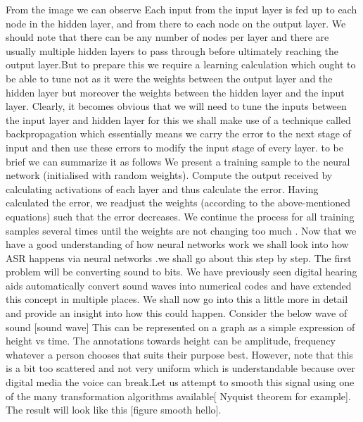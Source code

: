 \documentclass[sigconf]{acmart}
\begin{document}
From the image we can observe Each input from the input layer is fed up to each node in the hidden layer, and from there to each node on the output layer. We should note that there can be any number of nodes per layer and there are usually multiple hidden layers to pass through before ultimately reaching the output layer.But to prepare this we require a learning calculation which ought to be able to tune not as it were the weights between the output layer and the hidden layer but moreover the weights between the hidden layer and the input layer. Clearly, it becomes obvious that we will need to tune the inputs between the input layer and hidden layer for this we shall make use of a technique called backpropagation which essentially means we carry the error to the next stage of input and then use these errors to modify the input stage of every layer. to be brief we can summarize it as follows We present a training sample to the neural network (initialised with random weights). Compute the output received by calculating activations of each layer and thus calculate the error. Having calculated the error, we readjust the weights (according to the above-mentioned equations) such that the error decreases. We continue the process for all training samples several times until the weights are not changing too much \cite{Pokarna2017}. 
\newline
Now that we have a good understanding of how neural networks work we shall look into how ASR happens via neural networks \cite{Green1999}.we shall go about this step by step. The first problem will be converting sound to bits. We have previously seen digital hearing aids automatically convert sound waves into numerical codes and have extended this concept in multiple places. We shall now go into this a little more in detail and provide an insight into how this could happen. Consider the below wave of sound [sound wave] 
This can be represented on a graph as a simple expression of height vs time. The annotations towards height can be amplitude, frequency whatever a person chooses that suits their purpose best. However, note that this is a bit too scattered and not very uniform which is understandable because over digital media the voice can break.Let us attempt to smooth this signal using one of the many transformation algorithms available[ Nyquist theorem for example]. The result will look like this [figure smooth hello].
\newline
\end{document}
